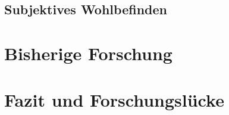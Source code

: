 \subsection{Subjektives Wohlbefinden}\label{subsection.subjektivesWohlbefinden}

\section{Bisherige Forschung}\label{section.bisherigeForschung}

\section{Fazit und Forschungslücke}\label{section.fazitLücke}


